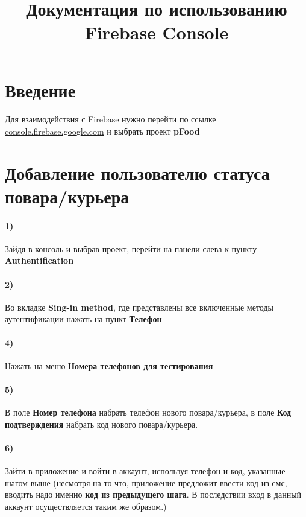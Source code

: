 \documentclass{article}
\title{Документация по использованию\\Firebase Console}
\date{}
\begin{document}
\maketitle

\section{Введение}
    \paragraph*{}
    {
        Для взаимодействия с Firebase нужно перейти по ссылке \underline{console.firebase.google.com} и выбрать проект \textbf{pFood}\\
    }
\section{Добавление пользователю статуса повара/курьера}
  \paragraph{1)}
   {
        Зайдя в консоль и выбрав проект, перейти на панели слева к пункту \textbf{Authentification}
   }
   \paragraph{2)}
   {
        Во вкладке \textbf{Sing-in method}, где представлены все включенные методы аутентификации нажать на пункт \textbf{Телефон}
   }
   \paragraph{4)}
   {
        Нажать на меню \textbf{Номера телефонов для тестирования}
   }
   \paragraph{5)}
   {
        В поле \textbf{Номер телефона} набрать телефон нового повара/курьера, в поле \textbf{Код подтверждения} набрать код нового повара/курьера.
   }
   \paragraph{6)}
   {
        Зайти в приложение и войти в аккаунт, используя телефон и код, указанные шагом выше (несмотря на то что, приложение предложит ввести код из смс, вводить надо именно \textbf{код из предыдущего шага}. В последствии вход в данный аккаунт осуществляется таким же образом.)
   }
\end{document}

